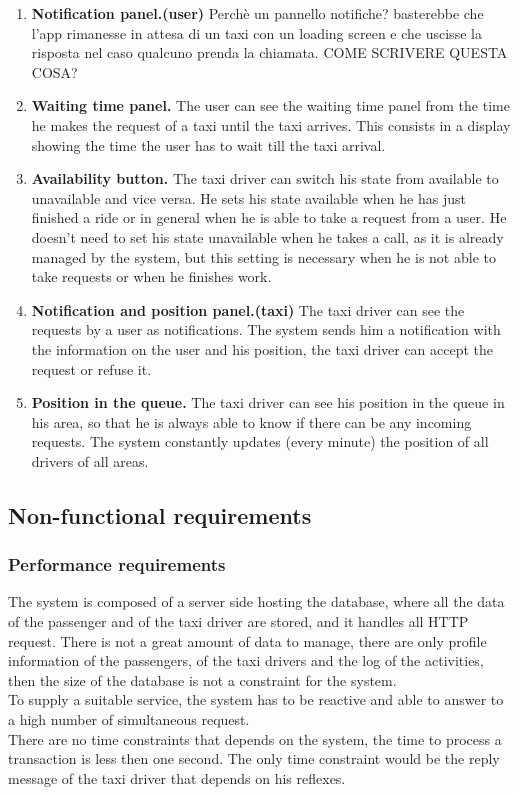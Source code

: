\documentclass[18pt,oneside,a4paper, titlepage]{article}
\begin{document}
\begin{enumerate}
			\item \textbf{Notification panel.(user)}
				Perchè un pannello notifiche? basterebbe che l'app rimanesse in attesa di un taxi con un loading screen e che uscisse la risposta nel caso qualcuno prenda la chiamata. COME SCRIVERE QUESTA COSA?
			\item \textbf{Waiting time panel.}
				The user can see the waiting time panel from the time he makes the request of a taxi until the taxi arrives. This consists in a display showing the time the user has to wait till the taxi arrival.
				
			\item \textbf{Availability button.}
				The taxi driver can switch his state from available to unavailable and vice versa. He sets his state available when he has just finished a ride or in general when he is able to take a request from a user. He doesn't need to set his state unavailable when he takes a call, as it is already managed by the system, but this setting is necessary when he is not able to take requests or when he finishes work.
			\item \textbf{Notification and position panel.(taxi)}
				The taxi driver can see the requests by a user as notifications. The system sends him a notification with the information on the user and his position, the taxi driver can accept the request or refuse it.
			\item \textbf{Position in the queue.}
				The taxi driver can see his position in the queue in his area, so that he is always able to know if there can be any incoming requests. The system constantly updates (every minute) the position of all drivers of all areas.
		\end{enumerate}
	\subsection{Non-functional requirements}
		\subsubsection{Performance requirements}
			The system is composed of a server side hosting the database, where all the data of the passenger and of the taxi driver are stored, and it handles all HTTP request. There is not a great amount of data to manage, there are only profile information of the passengers, of the taxi drivers and the log of the activities, then the size of the database is not a constraint for the system.\\ To supply a suitable service, the system has to be reactive and able to answer to a high number of simultaneous request.\\ There are no time constraints that depends on the system, the time to process a transaction is less then one second. The only time constraint would be the reply message of the taxi driver that depends on his reflexes.
\end{document}
